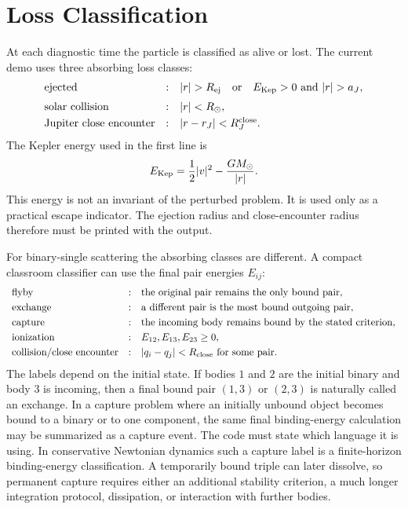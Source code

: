 \section{Loss Classification}
\label{sec:three-body-loss-classification}

At each diagnostic time the particle is classified as alive or lost.  The
current demo uses three absorbing loss classes:
\[
\begin{array}{lll}
\text{ejected} &:& |r|>R_{\rm ej}\quad \text{or}\quad
E_{\rm Kep}>0 \text{ and } |r|>a_J,\\[2mm]
\text{solar collision} &:& |r|<R_\odot,\\[1mm]
\text{Jupiter close encounter} &:& |r-r_J|<R_J^{\rm close}.
\end{array}
\]
The Kepler energy used in the first line is
\[
        E_{\rm Kep}=\frac{1}{2}|v|^2-\frac{GM_\odot}{|r|}.
\]
This energy is not an invariant of the perturbed problem.  It is used only as
a practical escape indicator.  The ejection radius and close-encounter radius
therefore must be printed with the output.

For binary-single scattering the absorbing classes are different.  A compact
classroom classifier can use the final pair energies \(E_{ij}\):
\[
\begin{array}{lll}
\text{flyby} &:& \text{the original pair remains the only bound pair},\\[1mm]
\text{exchange} &:& \text{a different pair is the most bound outgoing pair},\\[1mm]
\text{capture} &:& \text{the incoming body remains bound by the stated
criterion},\\[1mm]
\text{ionization} &:& E_{12},E_{13},E_{23}\ge0,\\[1mm]
\text{collision/close encounter} &:& |q_i-q_j|<R_{\rm close}
\text{ for some pair}.
\end{array}
\]
The labels depend on the initial state.  If bodies \(1\) and \(2\) are the
initial binary and body \(3\) is incoming, then a final bound pair \((1,3)\) or
\((2,3)\) is naturally called an exchange.  In a capture problem where an
initially unbound object becomes bound to a binary or to one component, the
same final binding-energy calculation may be summarized as a capture event.
The code must state which language it is using.
In conservative Newtonian dynamics such a capture label is a finite-horizon
binding-energy classification.  A temporarily bound triple can later dissolve,
so permanent capture requires either an additional stability criterion, a much
longer integration protocol, dissipation, or interaction with further bodies.

